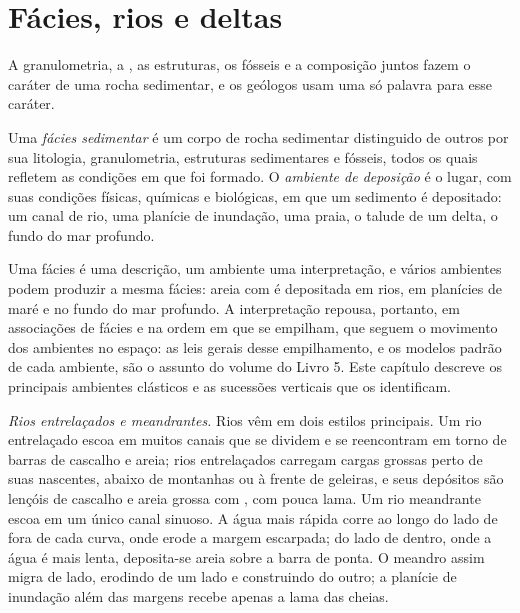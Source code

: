 \section{Fácies, rios e deltas}\label{sec:b1:clastic-sediments:rivers-deltas}

A granulometria, a , as estruturas, os fósseis e a composição juntos fazem o caráter de uma rocha sedimentar, e os geólogos usam uma só palavra para esse caráter.

\begin{definition}\label{def:b1:clastic-sediments:facies}
Uma \emph{fácies sedimentar} é um corpo de rocha sedimentar distinguido de outros por sua litologia, granulometria, estruturas sedimentares e fósseis, todos os quais refletem as condições em que foi formado. O \emph{ambiente de deposição} é o lugar, com suas condições físicas, químicas e biológicas, em que um sedimento é depositado: um canal de rio, uma planície de inundação, uma praia, o talude de um delta, o fundo do mar profundo.
\end{definition}

Uma fácies é uma descrição, um ambiente uma interpretação, e vários ambientes podem produzir a mesma fácies: areia com  é depositada em rios, em planícies de maré e no fundo do mar profundo. A interpretação repousa, portanto, em associações de fácies e na ordem em que se empilham, que seguem o movimento dos ambientes no espaço: as leis gerais desse empilhamento, e os modelos padrão de cada ambiente, são o assunto do volume do Livro 5. Este capítulo descreve os principais ambientes clásticos e as sucessões verticais que os identificam.

\emph{Rios entrelaçados e meandrantes.} Rios vêm em dois estilos principais. Um rio entrelaçado escoa em muitos canais que se dividem e se reencontram em torno de barras de cascalho e areia; rios entrelaçados carregam cargas grossas perto de suas nascentes, abaixo de montanhas ou à frente de geleiras, e seus depósitos são lençóis de cascalho e areia grossa com , com pouca lama. Um rio meandrante escoa em um único canal sinuoso. A água mais rápida corre ao longo do lado de fora de cada curva, onde erode a margem escarpada; do lado de dentro, onde a água é mais lenta, deposita-se areia sobre a barra de ponta. O meandro assim migra de lado, erodindo de um lado e construindo do outro; a planície de inundação além das margens recebe apenas a lama das cheias.

